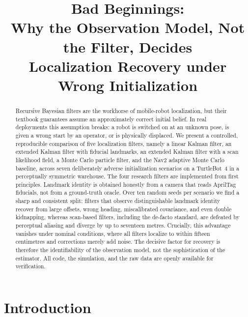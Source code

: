 \documentclass[conference]{IEEEtran}
\begin{document}
\title{Bad Beginnings:\\ Why the Observation Model, Not the Filter, Decides\\ Localization Recovery under Wrong Initialization}

\author{
}

\maketitle

\begin{abstract}
Recursive Bayesian filters are the workhorse of mobile-robot localization, but their textbook guarantees assume an approximately correct initial belief. In real deployments this assumption breaks: a robot is switched on at an unknown pose, is given a wrong start by an operator, or is physically displaced. We present a controlled, reproducible comparison of five localization filters, namely a linear Kalman filter, an extended Kalman filter with fiducial landmarks, an extended Kalman filter with a scan likelihood field, a Monte Carlo particle filter, and the Nav2 adaptive Monte Carlo baseline, across seven deliberately adverse initialization scenarios on a TurtleBot~4 in a perceptually symmetric warehouse. The four research filters are implemented from first principles. Landmark identity is obtained honestly from a camera that reads AprilTag fiducials, not from a ground-truth oracle. Over ten random seeds per scenario we find a sharp and consistent split: filters that observe distinguishable landmark identity recover from large offsets, wrong heading, miscalibrated covariance, and even double kidnapping, whereas scan-based filters, including the de-facto standard, are defeated by perceptual aliasing and diverge by up to seventeen metres. Crucially, this advantage vanishes under nominal conditions, where all filters localize to within fifteen centimetres and corrections merely add noise. The decisive factor for recovery is therefore the identifiability of the observation model, not the sophistication of the estimator. All code, the simulation, and the raw data are openly available for verification.
\end{abstract}

\section{Introduction}
\end{document}
